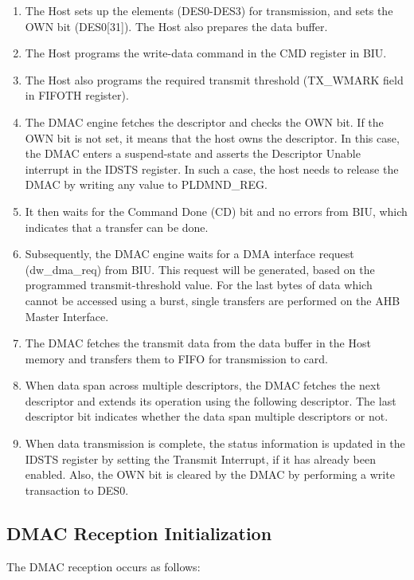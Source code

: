 \documentclass[main\_\_EN.tex]{subfiles}
\begin{document}
\begin{enumerate}
\item The Host sets up the elements (DES0-DES3) for transmission, and sets the OWN bit (DES0[31]). The Host also prepares the data buffer.
\item The Host programs the write-data command in the CMD register in BIU.
\item The Host also programs the required transmit threshold  (TX\_WMARK field in FIFOTH register).
\item The DMAC engine fetches the descriptor and checks the OWN bit. If the OWN bit is not set, it means that the host owns the descriptor. In this case, the DMAC enters a suspend-state and asserts the Descriptor Unable interrupt in the IDSTS register. In such a case, the host needs to release the DMAC by writing any value to PLDMND\_REG.
\item It then waits for the Command Done (CD) bit and no errors from BIU, which indicates that a transfer can be done.
\item Subsequently, the DMAC engine waits for a DMA interface request (dw\_dma\_req) from BIU. This request will be generated, based on the programmed transmit-threshold value. For the last bytes of data which cannot be accessed using a burst, single transfers are performed on the AHB Master Interface.
\item The DMAC fetches the transmit data from the data buffer in the Host memory and transfers them to FIFO for transmission to card.
\item When data span across multiple descriptors, the DMAC fetches the next descriptor and extends its operation using the following descriptor. The last descriptor bit indicates whether the data span multiple descriptors or not.
\item When data transmission is complete, the status information is updated in the IDSTS register by setting the Transmit Interrupt, if it has already been enabled. Also, the OWN bit is cleared by the DMAC by performing a write transaction to DES0.
\end{enumerate}

\subsection{DMAC Reception Initialization}
The DMAC  reception occurs as follows:
\end{document}
